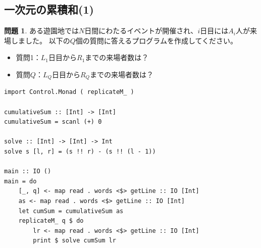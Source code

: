 \documentclass[12pt,a4paper,dvipdfmx,fleqn]{article}%
\theoremstyle{definition}
\newtheorem*{toi*}{問題}
\theoremstyle{definition}
\theoremstyle{definition}
\begin{document}
\subsection{一次元の累積和(1)}\label{一次元の累積和(1)}
\begin{toi*}
    ある遊園地では$N$日間にわたるイベントが開催され、$i$日目には$A_i$人が来場しました。
    以下の$Q$個の質問に答えるプログラムを作成してください。
    \begin{itemize}
        \item [] 質問1：$L_1$日目から$R_1$までの来場者数は？\\[2mm]
        \hspace{2em}{\vdots}
        \item [] 質問$Q$：$L_Q$日目から$R_Q$までの来場者数は？
    \end{itemize}
\end{toi*}
\begin{lstlisting}[caption=A06\_00.hs,label=A06_00]
import Control.Monad ( replicateM_ )

cumulativeSum :: [Int] -> [Int]
cumulativeSum = scanl (+) 0

solve :: [Int] -> [Int] -> Int
solve s [l, r] = (s !! r) - (s !! (l - 1))

main :: IO ()
main = do
    [_, q] <- map read . words <$> getLine :: IO [Int]
    as <- map read . words <$> getLine :: IO [Int]
    let cumSum = cumulativeSum as
    replicateM_ q $ do
        lr <- map read . words <$> getLine :: IO [Int]
        print $ solve cumSum lr
\end{lstlisting}
\end{document}
